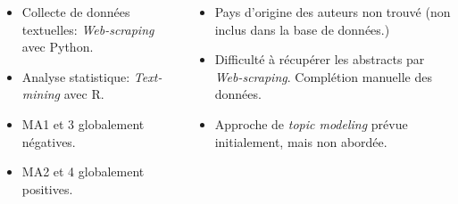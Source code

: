 \documentclass[xcolor=dvipsnames]{beamer}
\begin{document}
	\begin{frame}
		\begin{columns}
			\begin{column}{0.5\textwidth} %
				\begin{itemize}
					\item Collecte de données textuelles: \textit{Web-scraping} avec Python.
					\item Analyse statistique: \textit{Text-mining} avec R.
					\item MA1 et 3 globalement négatives.
					\item MA2 et 4 globalement positives.
				\end{itemize}
			\end{column}

			\begin{column}{0.5\textwidth}
				\begin{itemize}
					\item Pays d'origine des auteurs non trouvé (non inclus dans la base de données.)
					\item Difficulté à récupérer les abstracts par \textit{Web-scraping}. Complétion manuelle des données.
					\item Approche de \textit{topic modeling} prévue initialement, mais non abordée.
				\end{itemize}
			\end{column}
		\end{columns}
	\end{frame}
\end{document}
